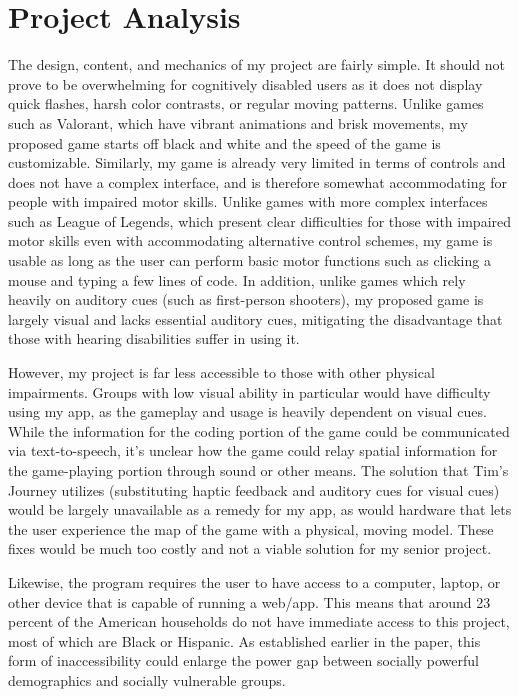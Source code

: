 \documentclass[10pt,twocolumn]{article}
\begin{document}
\section{Project Analysis}
    The design, content, and mechanics of my project are fairly simple. It should not prove to be overwhelming for cognitively disabled users as it does not display quick flashes, harsh color contrasts, or regular moving patterns. Unlike games such as Valorant, which have vibrant animations and brisk movements, my proposed game starts off black and white and the speed of the game is customizable. Similarly, my game is already very limited in terms of controls and does not have a complex interface, and is therefore somewhat accommodating for people with impaired motor skills. Unlike games with more complex interfaces such as League of Legends, which present clear difficulties for those with impaired motor skills even with accommodating alternative control schemes, my game is usable as long as the user can perform basic motor functions such as clicking a mouse and typing a few lines of code. In addition, unlike games which rely heavily on auditory cues (such as first-person shooters), my proposed game is largely visual and lacks essential auditory cues, mitigating the disadvantage that those with hearing disabilities suffer in using it.
    
    However, my project is far less accessible to those with other physical impairments. Groups with low visual ability in particular would have difficulty using my app, as the gameplay and usage is heavily dependent on visual cues. While the information for the coding portion of the game could be communicated via text-to-speech, it's unclear how the game could relay spatial information for the game-playing portion through sound or other means. The solution that Tim's Journey utilizes (substituting haptic feedback and auditory cues for visual cues) would be largely unavailable as a remedy for my app, as would hardware that lets the user experience the map of the game with a physical, moving model. These fixes would be much too costly and not a viable solution for my senior project.

    Likewise, the program requires the user to have access to a computer, laptop, or other device that is capable of running a web/app. This means that around 23 percent of the American households do not have immediate access to this project, most of which are Black or Hispanic. As established earlier in the paper, this form of inaccessibility could enlarge the power gap between socially powerful demographics and socially vulnerable groups. 
\end{document}
